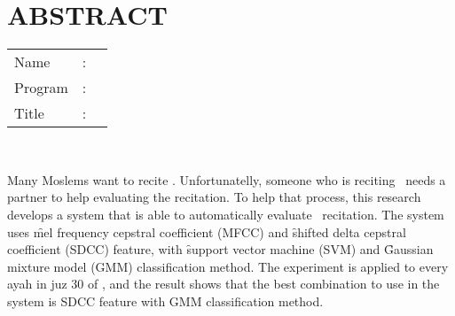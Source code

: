 %
%
%

	\chapter*{ABSTRACT}

\vspace*{0.2cm}

\noindent \begin{tabular}{l l p{11.0cm}}
	Name&: & \penulis \\
	Program&: & \programEng \\
	Title&: & \judulInggris \\
\end{tabular} \\ 

\vspace*{0.5cm}

\noindent 
Many Moslems want to recite \quran. Unfortunatelly, someone who is reciting \quran~needs a partner to help evaluating the recitation. To help that process, this research develops a system that is able to automatically evaluate \quran~recitation. The system uses \f{mel frequency cepstral coefficient} (MFCC) and \f{shifted delta cepstral coefficient} (SDCC) feature, with \f{support vector machine} (SVM) and \f{Gaussian mixture model} (GMM) classification method. The experiment is applied to every ayah in juz 30 of \quran, and the result shows that the best combination to use in the system is SDCC feature with GMM classification method. \\


